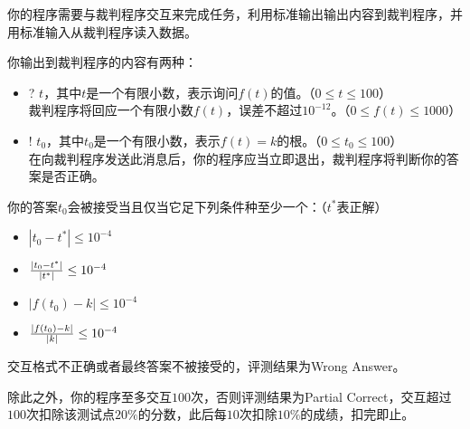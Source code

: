 你的程序需要与裁判程序交互来完成任务，利用标准输出输出内容到裁判程序，并用标准输入从裁判程序读入数据。

你输出到裁判程序的内容有两种：

\begin{itemize}
\item ? $t$，其中$t$是一个有限小数，表示询问$f(t)$的值。（$0 \le t \le 100$）\\
裁判程序将回应一个有限小数$f(t)$，误差不超过$10^{-12}$。（$0 \le f(t) \le 1000$）
\item ! $t_0$，其中$t_0$是一个有限小数，表示$f(t) = k$的根。（$0 \le t_0 \le 100$）\\
在向裁判程序发送此消息后，你的程序应当立即退出，裁判程序将判断你的答案是否正确。
\end{itemize}

你的答案$t_0$会被接受当且仅当它足下列条件种至少一个：（$t^*$表正解）
\begin{itemize}
\item $|t_0 - t^*| \le 10^{-4}$
\item ${|t_0 - t^*| \over |t^*|} \le 10^{-4}$
\item $|f(t_0) - k| \le 10^{-4}$
\item ${|f(t_0) - k| \over |k|} \le 10^{-4}$
\end{itemize}

交互格式不正确或者最终答案不被接受的，评测结果为Wrong Answer。

除此之外，你的程序至多交互$100$次，否则评测结果为Partial Correct，交互超过$100$次扣除该测试点$20\%$的分数，此后每$10$次扣除$10\%$的成绩，扣完即止。